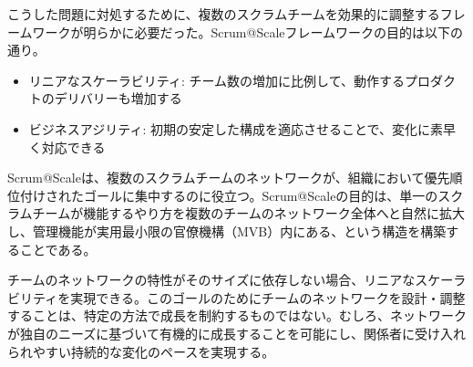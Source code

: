 \documentclass[12pt,a4paper,parskip=full]{scrartcl}
\begin{document}

こうした問題に対処するために、複数のスクラムチームを効果的に調整するフレームワークが明らかに必要だった。Scrum@Scaleフレームワークの目的は以下の通り。

\begin{itemize}
\itemsep10pt

\item
リニアなスケーラビリティ: チーム数の増加に比例して、動作するプロダクトのデリバリーも増加する
\item
ビジネスアジリティ: 初期の安定した構成を適応させることで、変化に素早く対応できる
\end{itemize}

Scrum@Scaleは、複数のスクラムチームのネットワークが、組織において優先順位付けされたゴールに集中するのに役立つ。Scrum@Scaleの目的は、単一のスクラムチームが機能するやり方を複数のチームのネットワーク全体へと自然に拡大し、管理機能が実用最小限の官僚機構（MVB）内にある、という構造を構築することである。

チームのネットワークの特性がそのサイズに依存しない場合、リニアなスケーラビリティを実現できる。このゴールのためにチームのネットワークを設計・調整することは、特定の方法で成長を制約するものではない。むしろ、ネットワークが独自のニーズに基づいて有機的に成長することを可能にし、関係者に受け入れられやすい持続的な変化のペースを実現する。
\end{document}
